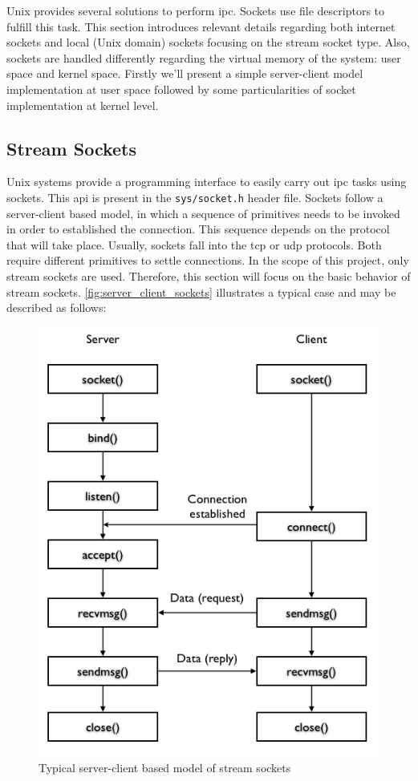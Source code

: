 Unix provides several solutions to perform \gls{ipc}. Sockets use file descriptors to fulfill this task. This section introduces relevant details regarding both internet sockets and local (Unix domain) sockets focusing on the stream socket type. Also, sockets are handled differently regarding the virtual memory of the system: user space and kernel space. Firstly we'll present a simple server-client model implementation at user space followed by some particularities of socket implementation at kernel level.

\subsection{Stream Sockets}

Unix systems provide a programming interface to easily carry out \gls{ipc} tasks using sockets. This \gls{api} is present in the \texttt{sys/socket.h} header file. Sockets follow a server-client based model, in which a sequence of primitives needs to be invoked in order to established the connection. This sequence depends on the protocol that will take place. Usually, sockets fall into the \gls{tcp} or \gls{udp} protocols. Both require different primitives to settle connections. In the scope of this project, only stream sockets are used. Therefore, this section will focus on the basic behavior of stream sockets. \autoref{fig:server_client_sockets} illustrates a typical case and may be described as follows:

\begin{figure}[h]
 \centering
 \includegraphics[scale=0.5]{figures/server_client_sockets.png}
 \caption{Typical server-client based model of stream sockets}
 \label{fig:server_client_sockets}
\end{figure}

